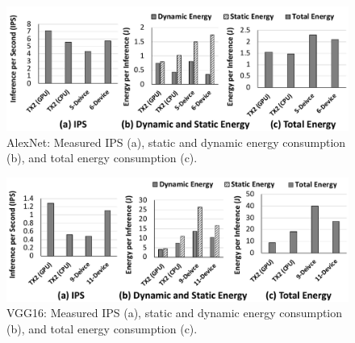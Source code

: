 \documentclass[sigplan]{acmart}
\begin{document}
%
%
\begin{figure}[h]
\centering
\vspace{-5pt}
\includegraphics[width=1.0\linewidth]{figures/alexnet-res.pdf}
\captionsetup{singlelinecheck=on,aboveskip=5pt, belowskip=0pt}
\caption{AlexNet: Measured IPS (a), static and dynamic energy consumption (b), and total energy consumption (c).}
\label{fig:alexnet-res}
\vspace{-15pt}
\end{figure}
%
%
\begin{figure}[h]
\centering
\vspace{0pt}
\includegraphics[width=1.0\linewidth]{figures/vgg16-res.pdf}
\captionsetup{singlelinecheck=on,aboveskip=5pt, belowskip=0pt}
\caption{VGG16: Measured IPS (a), static and dynamic energy consumption (b), and total energy consumption (c).}
\label{fig:vgg16-res}
\vspace{-10pt}
\end{figure}
%
%




\end{document}
